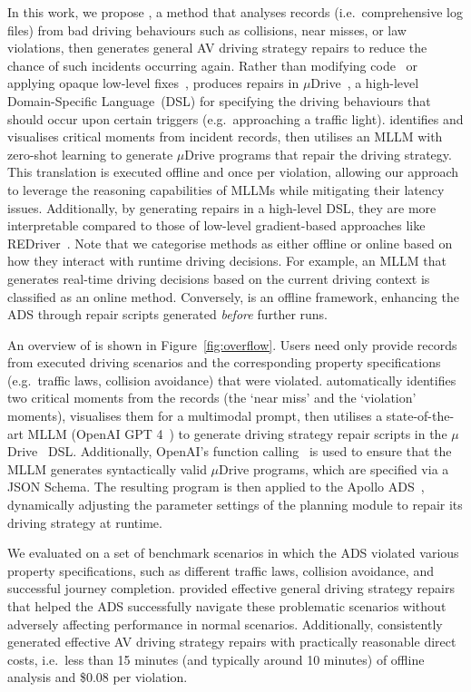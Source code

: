 In this work, we propose \coolname, a method that analyses records (i.e.~comprehensive log files) from bad driving behaviours such as collisions, near misses, or law violations, then generates general AV driving strategy repairs to reduce the chance of such incidents occurring again.
Rather than modifying code~\cite{LeGouesDFW12} or applying opaque low-level fixes~\cite{sun2024redriver}, \coolname produces repairs in $\mu$Drive~\cite{wang2024mudrive}, a high-level Domain-Specific Language~(DSL) for specifying the driving behaviours that should occur upon certain triggers (e.g.~approaching a traffic light).
\coolname identifies and visualises critical moments from incident records, then utilises an MLLM with zero-shot learning to generate $\mu$Drive programs that repair the driving strategy.
This translation is executed offline and once per violation, allowing our approach to leverage the reasoning capabilities of MLLMs while mitigating their latency issues.
Additionally, by generating repairs in a high-level DSL, they are more interpretable compared to those of low-level gradient-based approaches like REDriver~\cite{sun2024redriver}.
Note that we categorise methods as either offline or online based on how they interact with runtime driving decisions. For example, an MLLM that generates real-time driving decisions based on the current driving context is classified as an online method. Conversely, \coolname is an offline framework, enhancing the ADS through repair scripts generated \emph{before} further runs.



An overview of \coolname is shown in Figure~\ref{fig:overflow}.
Users need only provide records from executed driving scenarios and the corresponding property specifications (e.g.~traffic laws, collision avoidance) that were violated.
\coolname automatically identifies two critical moments from the records (the `near miss' and the `violation' moments), visualises them for a multimodal prompt, then utilises a state-of-the-art MLLM (OpenAI GPT 4~\cite{openaichatgpt}) to generate driving strategy repair scripts in the $\mu$Drive~\cite{wang2024mudrive} DSL.
Additionally, OpenAI's function calling~\cite{gpt_function_calling} is used to ensure that the MLLM generates syntactically valid $\mu$Drive programs, which are specified via a JSON Schema.
The resulting program is then applied to the Apollo ADS~\cite{apollo90}, dynamically adjusting the parameter settings of the planning module to repair its driving strategy at runtime.


We evaluated \coolname on a set of benchmark scenarios in which the ADS violated various property specifications, such as different traffic laws, collision avoidance, and successful journey completion. \coolname provided effective general driving strategy repairs that helped the ADS successfully navigate these problematic scenarios without adversely affecting performance in normal scenarios. Additionally, \coolname consistently generated effective AV driving strategy repairs with practically reasonable direct costs, i.e.~less than 15 minutes (and typically around 10 minutes) of offline analysis and \$0.08 per violation.
